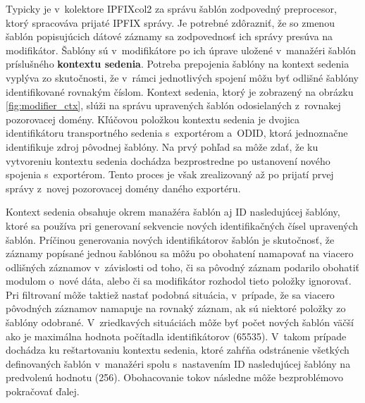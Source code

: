 Typicky je v~kolektore IPFIXcol2 za správu šablón zodpovedný preprocesor, ktorý spracováva prijaté IPFIX správy. Je potrebné zdôrazniť, že so zmenou šablón popisujúcich dátové záznamy sa zodpovednosť ich správy presúva na modifikátor.
Šablóny sú v~modifikátore po ich úprave uložené v~manažéri šablón príslušného \textbf{kontextu sedenia}. Potreba prepojenia šablóny na kontext sedenia vyplýva zo skutočnosti, že v~rámci jednotlivých spojení môžu byť odlišné šablóny
identifikované rovnakým číslom. Kontext sedenia, ktorý je zobrazený na obrázku \ref{fig:modifier_ctx}, slúži na správu upravených šablón odosielaných z~rovnakej pozorovacej domény. Kľúčovou položkou kontextu sedenia je dvojica
identifikátoru transportného sedenia s~exportérom a~ODID, ktorá jednoznačne identifikuje zdroj pôvodnej šablóny. Na prvý pohľad sa môže zdať, že ku vytvoreniu kontextu sedenia dochádza bezprostredne po ustanovení nového spojenia s~exportérom.
Tento proces je však zrealizovaný až po prijatí prvej správy z~novej pozorovacej domény daného exportéru.

Kontext sedenia obsahuje okrem manažéra šablón aj ID nasledujúcej šablóny, ktoré sa používa pri generovaní sekvencie nových identifikačných čísel upravených šablón.
Príčinou generovania nových identifikátorov šablón je skutočnosť, že záznamy popísané jednou šablónou sa môžu po obohatení namapovať na viacero odlišných záznamov v~závislosti od toho, či sa pôvodný záznam podarilo obohatiť modulom
o~nové dáta, alebo či sa modifikátor rozhodol tieto položky ignorovať. Pri filtrovaní môže taktiež nastať podobná situácia, v~prípade, že sa viacero pôvodných záznamov namapuje na rovnaký záznam, ak sú niektoré položky zo šablóny odobrané.
V~zriedkavých situáciách môže byť počet nových šablón väčší ako je maximálna hodnota počítadla identifikátorov (65535). V~takom prípade dochádza ku reštartovaniu kontextu sedenia, ktoré zahŕňa odstránenie všetkých
definovaných šablón v~manažéri spolu s~nastavením ID nasledujúcej šablóny na predvolenú hodnotu (256). Obohacovanie tokov následne môže bezproblémovo pokračovať ďalej.

